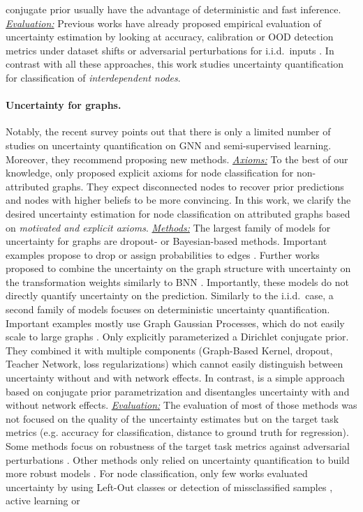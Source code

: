 conjugate prior usually have the advantage of deterministic and fast inference. \emph{\underline{Evaluation:}} Previous works have already proposed empirical evaluation of uncertainty estimation by looking at accuracy, calibration or OOD detection metrics under dataset shifts or adversarial perturbations for i.i.d.\ inputs \citep{Ovadia2019, robustness-uncertainty-dirichlet}. In contrast with all these approaches, this work studies uncertainty quantification for classification of \emph{interdependent nodes}.

\paragraph{Uncertainty for graphs.} Notably, the recent survey \citep{Abdar2020} points out that there is only a limited number of studies on uncertainty quantification on GNN and semi-supervised learning. Moreover, they recommend proposing new methods. \emph{\underline{Axioms:}} To the best of our knowledge, only \citep{Eswaran2017} proposed explicit axioms for node classification for non-attributed graphs. They expect disconnected nodes to recover prior predictions and nodes with higher beliefs to be more convincing. In this work, we clarify the desired uncertainty estimation for node classification on attributed graphs based on \emph{motivated and explicit axioms}. \emph{\underline{Methods:}} The largest family of models for uncertainty for graphs are dropout- or Bayesian-based methods. Important examples propose to drop or assign probabilities to edges \citep{Rong2019, Chen2018, Hasanzadeh2020, Dallachiesa2014, Hu2017}. Further works proposed to combine the uncertainty on the graph structure with uncertainty on the transformation weights similarly to BNN \citep{Elinas2019, Zhang2019b, Pal2019a, Pal2019b}. Importantly, these models do not directly quantify uncertainty on the prediction. Similarly to the i.i.d.\ case, a second family of models focuses on deterministic uncertainty quantification. Important examples mostly use Graph Gaussian Processes, which do not easily scale to large graphs \citep{Ng2018, Zhi2020, Liu2020c, Borovitskiy2020}. Only \citep{Zhao2020} explicitly parameterized a Dirichlet conjugate prior. They combined it with multiple components (Graph-Based Kernel, dropout, Teacher Network, loss regularizations) which cannot easily distinguish between uncertainty without and with network effects. In contrast, \GPNacro{} is a simple approach based on conjugate prior parametrization and disentangles uncertainty with and without network effects. \emph{\underline{Evaluation:}} The evaluation of most of those methods was not focused on the quality of the uncertainty estimates but on the target task metrics (e.g. accuracy for classification, distance to ground truth for regression). Some methods focus on robustness of the target task metrics against adversarial perturbations \citep{GNNBook-ch8-gunnemann, zugner2018adversarial, zugner2019adversarial}. Other methods only relied on uncertainty quantification to build more robust models \citep{Zhu2019, Feng2020}. For node classification, only few works evaluated uncertainty by using Left-Out classes or detection of missclassified samples \citep{Zhao2020}, active learning \cite{Ng2018} or 